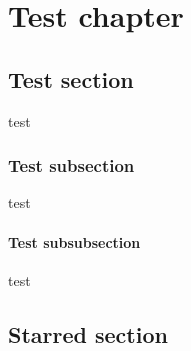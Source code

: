 \documentclass[a4paper,oneside]{memoir}
\begin{document}

\tableofcontents*

\chapter{Test chapter}

\section{Test section}

test
   \tagmcend
 \tagstructend


\subsection{Test subsection}

test
   \tagmcend
 \tagstructend

\subsubsection{Test subsubsection}

test
   \tagmcend
 \tagstructend

\section*{Starred section}

\tagstructend
\end{document}
